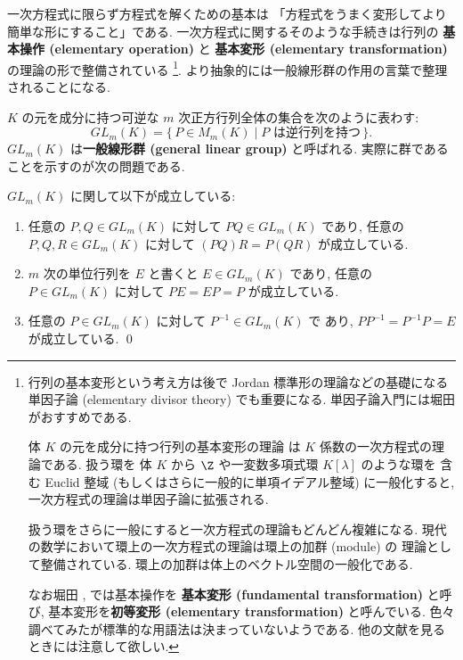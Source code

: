\documentclass[12pt,twoside]{jarticle}
\begin{document}
一次方程式に限らず方程式を解くための基本は
「方程式をうまく変形してより簡単な形にすること」である.  
一次方程式に関するそのような手続きは行列の
{\bf 基本操作 (elementary operation)} と
{\bf 基本変形 (elementary transformation)} の理論の形で整備されている%
\footnote{行列の基本変形という考え方は後で
  Jordan 標準形の理論などの基礎になる単因子論 (elementary divisor theory) 
  でも重要になる. 単因子論入門には堀田 \cite{10wa} がおすすめである.

  体 $K$ の元を成分に持つ行列の基本変形の理論
  は $K$ 係数の一次方程式の理論である.  扱う環を
  体 $K$ から $\Z$ や一変数多項式環 $K[\lambda]$ のような環を
  含む Euclid 整域 (もしくはさらに一般的に単項イデアル整域) に一般化すると, 
  一次方程式の理論は単因子論に拡張される.

  扱う環をさらに一般にすると一次方程式の理論もどんどん複雑になる.
  現代の数学において環上の一次方程式の理論は環上の加群 (module) の
  理論として整備されている.  環上の加群は体上のベクトル空間の一般化である.
  
  なお堀田 \cite{gun-kagun}, \cite{10wa} では基本操作を
  {\bf 基本変形 (fundamental transformation)} と呼び,
  基本変形を{\bf 初等変形 (elementary transformation)} と呼んでいる.
  色々調べてみたが標準的な用語法は決まっていないようである.
  他の文献を見るときには注意して欲しい.}.
より抽象的には一般線形群の作用の言葉で整理されることになる.


$K$ の元を成分に持つ可逆な $m$ 次正方行列全体の集合を次のように表わす:
\begin{equation*}
  GL_m(K) = \{\, P\in M_m(K)\mid \text{$P$ は逆行列を持つ}\,\}.
\end{equation*}
$GL_m(K)$ は{\bf 一般線形群 (general linear group)} と呼ばれる.
実際に群であることを示すのが次の問題である.

\begin{question}
  $GL_m(K)$ に関して以下が成立している:
  \begin{enumerate}
  \item 任意の $P,Q\in GL_m(K)$ に対して $PQ\in GL_m(K)$ であり, 
    任意の $P,Q,R\in GL_m(K)$ に対して $(PQ)R=P(QR)$ が成立している.
  \item $m$ 次の単位行列を $E$ と書くと $E\in GL_m(K)$ であり, 
    任意の $P\in GL_m(K)$ に対して $PE=EP=P$ が成立している.
  \item 任意の $P\in GL_m(K)$ に対して $P^{-1}\in GL_m(K)$ で
    あり, $PP^{-1}=P^{-1}P=E$ が成立している.
    \qed
  \end{enumerate}
\end{question}
\end{document}
